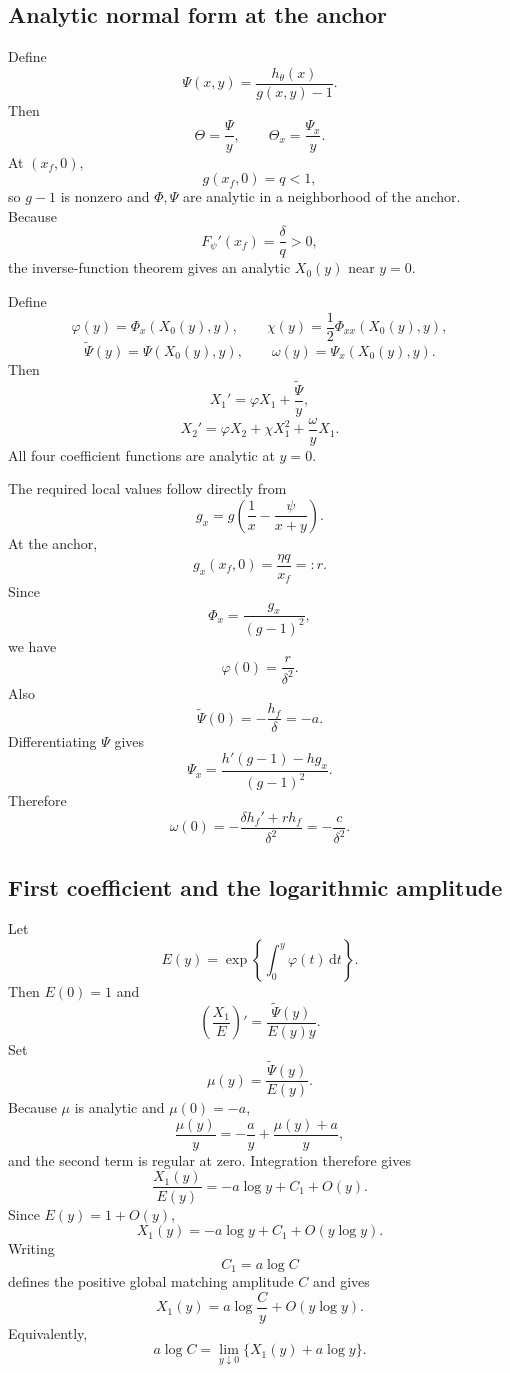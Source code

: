 \documentclass[11pt]{article}
\newcommand{\hth}{h_\theta}
\newcommand{\Fpsi}{F_\psi}
\newcommand{\xf}{x_f}
\newcommand{\dd}{\,\mathrm{d}}
\begin{document}
\subsection{Analytic normal form at the anchor}
Define
\[
\Psi(x,y)=\frac{\hth(x)}{g(x,y)-1}.
\]
Then
\[
\Theta=\frac\Psi y,
\qquad
\Theta_x=\frac{\Psi_x}{y}.
\]
At $(\xf,0)$,
\[
g(\xf,0)=q<1,
\]
so $g-1$ is nonzero and $\Phi,\Psi$ are analytic in a neighborhood of the anchor. Because
\[
\Fpsi'(\xf)=\frac\delta q>0,
\]
the inverse-function theorem gives an analytic $X_0(y)$ near $y=0$.

Define
\[
\varphi(y)=\Phi_x(X_0(y),y),
\qquad
\chi(y)=\frac12\Phi_{xx}(X_0(y),y),
\]
\[
\widetilde\Psi(y)=\Psi(X_0(y),y),
\qquad
\omega(y)=\Psi_x(X_0(y),y).
\]
Then
\[
\boxed{
X_1'=\varphi X_1+\frac{\widetilde\Psi}{y},
}
\]
\[
\boxed{
X_2'=\varphi X_2+\chi X_1^2+\frac\omega yX_1.
}
\]
All four coefficient functions are analytic at $y=0$.

The required local values follow directly from
\[
g_x=g\left(\frac1x-\frac\psi{x+y}\right).
\]
At the anchor,
\[
g_x(\xf,0)=\frac{\eta q}{\xf}=:r.
\]
Since
\[
\Phi_x=\frac{g_x}{(g-1)^2},
\]
we have
\[
\boxed{\varphi(0)=\frac r{\delta^2}.}
\]
Also
\[
\boxed{\widetilde\Psi(0)=-\frac{h_f}{\delta}=-a.}
\]
Differentiating $\Psi$ gives
\[
\Psi_x
=\frac{h'(g-1)-hg_x}{(g-1)^2}.
\]
Therefore
\[
\boxed{
\omega(0)
=-\frac{\delta h_f'+rh_f}{\delta^2}
=-\frac c{\delta^2}.
}
\]

\subsection{First coefficient and the logarithmic amplitude}
Let
\[
E(y)=\exp\left\{\int_0^y\varphi(t)\dd t\right\}.
\]
Then $E(0)=1$ and
\[
\left(\frac{X_1}{E}\right)'
=\frac{\widetilde\Psi(y)}{E(y)y}.
\]
Set
\[
\mu(y)=\frac{\widetilde\Psi(y)}{E(y)}.
\]
Because $\mu$ is analytic and $\mu(0)=-a$,
\[
\frac{\mu(y)}y
=-\frac ay+\frac{\mu(y)+a}{y},
\]
and the second term is regular at zero. Integration therefore gives
\[
\frac{X_1(y)}{E(y)}
=-a\log y+C_1+O(y).
\]
Since $E(y)=1+O(y)$,
\[
X_1(y)=-a\log y+C_1+O(y\log y).
\]
Writing
\[
C_1=a\log C
\]
defines the positive global matching amplitude $C$ and gives
\[
\boxed{
X_1(y)=a\log\frac C y+O(y\log y).
}
\]
Equivalently,
\[
\boxed{
a\log C
=\lim_{y\downarrow0}\{X_1(y)+a\log y\}.}
\]
\end{document}
